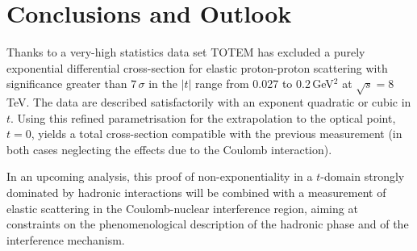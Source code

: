 
\section{Conclusions and Outlook}
\label{sec:conclusions}
%
Thanks to a very-high statistics data set TOTEM has excluded a purely exponential differential 
cross-section for elastic proton-proton scattering with significance greater than $7\,\sigma$
in the $|t|$ range from 0.027 to 0.2\,GeV$^{2}$ at $\sqrt{s}=8\,$TeV. The data
are described satisfactorily with an exponent quadratic or cubic in $t$.
Using this refined parametrisation for the extrapolation to the optical point,
$t = 0$, yields a total cross-section compatible with the previous measurement (in both cases
neglecting the effects due to the Coulomb interaction).

In an upcoming analysis, this proof of non-exponentiality in a 
$t$-domain strongly
dominated by hadronic interactions will be combined with a measurement of 
elastic scattering in the Coulomb-nuclear interference region, aiming at 
constraints on the phenomenological description of the hadronic phase and of 
the interference mechanism.


